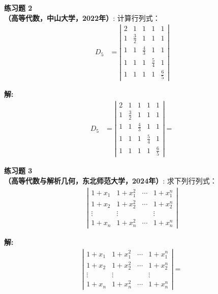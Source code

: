 \documentclass[a4paper, 11pt]{article}
\newenvironment{problem}[2][练习题]
    { \begin{mdframed}[backgroundcolor=gray!5] \textbf{#1 #2} \\}
    {  \end{mdframed}}
\newenvironment{solution}
    {\textbf{解:}}
    {}
\begin{document}
\begin{problem}{2}
\textbf{（高等代数，中山大学，2022年）}: 计算行列式：
\begin{align*}
D_{5} & =\left|\begin{array}{ccccc}
2 & 1 & 1 & 1 & 1 \\
1 & \frac{3}{2} & 1 & 1 & 1 \\
1 & 1 & \frac{4}{3} & 1 & 1 \\
1 & 1 & 1 & \frac{5}{4} & 1 \\
1 & 1 & 1 & 1 & \frac{6}{5}
\end{array}\right|
\end{align*}
\end{problem}

\begin{solution}
\begin{align*}
D_{5} & =\left|\begin{array}{ccccc}
2 & 1 & 1 & 1 & 1 \\
1 & \frac{3}{2} & 1 & 1 & 1 \\
1 & 1 & \frac{4}{3} & 1 & 1 \\
1 & 1 & 1 & \frac{5}{4} & 1 \\
1 & 1 & 1 & 1 & \frac{6}{5}
\end{array}\right|
=
\end{align*}

\end{solution} 

\begin{problem}{3}
\textbf{（高等代数与解析几何，东北师范大学，2024年）}: 求下列行列式：
\begin{align*}
\left|\begin{array}{cccc}
1+x_1 & 1+x_1^2 & \cdots & 1+x_1^n \\
1+x_2 & 1+x_2^2 & \cdots & 1+x_2^n \\
\vdots & \vdots & & \vdots \\
1+x_n & 1+x_n^2 & \cdots & 1+x_n^n
\end{array}\right|
\end{align*}
\end{problem}

\begin{solution}
\begin{align*}
\left|\begin{array}{cccc}
1+x_1 & 1+x_1^2 & \cdots & 1+x_1^n \\
1+x_2 & 1+x_2^2 & \cdots & 1+x_2^n \\
\vdots & \vdots & & \vdots \\
1+x_n & 1+x_n^2 & \cdots & 1+x_n^n
\end{array}\right|
=
\end{align*}
\end{solution} 



\end{document}
